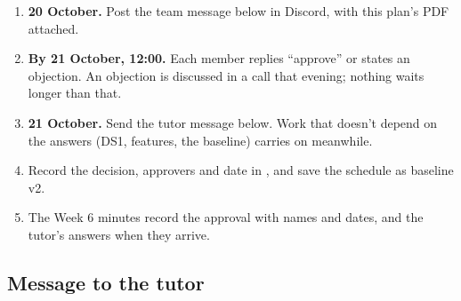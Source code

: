 \begin{enumerate}
  \item \textbf{20 October.} Post the team message below in Discord, with this plan's PDF attached.
  \item \textbf{By 21 October, 12:00.} Each member replies ``approve'' or states an objection.
    An objection is discussed in a call that evening; nothing waits longer than that.
  \item \textbf{21 October.} Send the tutor message below. Work that doesn't depend on the answers
    (DS1, features, the baseline) carries on meanwhile.
  \item Record the decision, approvers and date in , and save the
    schedule as baseline v2.
  \item The Week 6 minutes record the approval with names and dates, and the tutor's answers
    when they arrive.
\end{enumerate}

\subsection{Message to the tutor}

